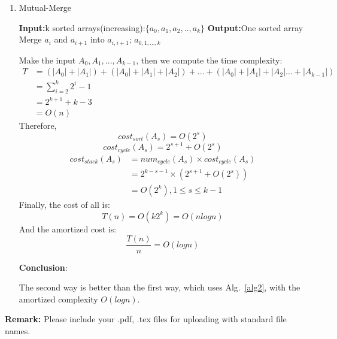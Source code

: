 \documentclass[12pt,a4paper]{article}
\makeatletter
\newtheorem*{solution}{Solution}
\theoremstyle{definition}
\renewenvironment{solution}[1][Solution] {\par\pushQED{\qed}\normalfont\topsep6\p@\@plus6\p@\relax\trivlist\item[\hskip\labelsep\bfseries#1\@addpunct{.}]\ignorespaces}{\popQED\endtrivlist\@endpefalse} \makeatother
\makeatother
\begin{document}
\begin{enumerate}
\begin{enumerate}
\begin{solution}
\begin{algorithm}[H]
\caption{Mutual-Merge}\label{alg2}
 \textbf{Input:}k sorted arrays(increasing):$\{a_0,a_1,a_2,..,a_k \}$\;
   \textbf{Output:}One sorted array\;
    {
        Merge $a_i$ and $a_{i+1}$ into $a_{i,i+1}$;
    }
    \Return $a_{0,1,...,k}$
\end{algorithm}

Make the input $A_0, A_1,...,A_{k-1}$, then we compute the time complexity:
$$
\begin{aligned}
T &= (|A_0|+|A_1|) + (|A_0|+|A_1|+|A_2|) +...+(|A_0|+|A_1|+|A_2|...+|A_{k-1}|)\\
&=\sum_{i=2}^{k}{2^i-1}\\
&=2^{k+1}+k-3\\
&=O(n)
\end{aligned}
$$
Therefore,
$$
cost_{sort}(A_s) = O(2^s)
$$
$$
cost_{cycle}(A_s) = 2^{s+1} + O(2^s)
$$
$$
\begin{aligned}
cost_{stack}(A_s) &= num_{cycle}(A_s) \times cost_{cycle}(A_s)\\
&=2^{k-s-1}\times (2^{s+1} + O(2^s))\\
&=O(2^k), 1\leq s \leq k-1
\end{aligned}
$$
Finally, the cost of all is:
$$
T(n) = O(k2^k) = O(nlogn)
$$
And the amortized cost is:
$$
\frac{T(n)}{n} = O(logn)
$$

\textbf{Conclusion}:

The second way is better than the first way, which uses Alg.~\ref{alg2}, with the amortized complexity $O(logn)$. 


\end{solution}
    \end{enumerate}
	
\end{enumerate}


\textbf{Remark:} Please include your .pdf, .tex files for uploading with standard file names.


\end{document}
